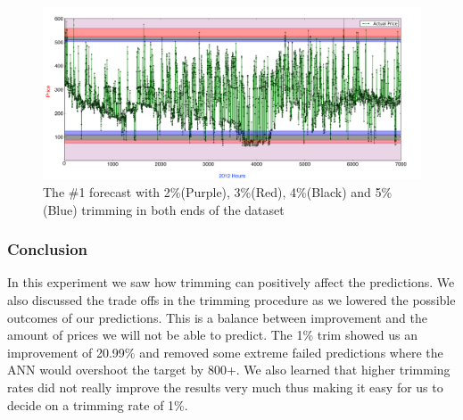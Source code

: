\begin{figure}[H]
\centering
\includegraphics[width=\linewidth]{billeder/PriceExperimentalAnalysis/restOfTrims.png}
\caption{The \#1 forecast with 2\%(Purple), 3\%(Red), 4\%(Black) and 5\%(Blue) trimming in both ends of the dataset}
\label{fig:AllTrims}
\end{figure}



\begin{table}[H]
\centering  %
\caption{Trims} %
\label{table:Top10Trimming} %
\end{table}


\subsubsection{Conclusion}
In this experiment we saw how trimming can positively affect the predictions. We also discussed the trade offs in the trimming procedure as we lowered the possible outcomes of our predictions. This is a balance between improvement and the amount of prices we will not be able to predict. The 1\% trim showed us an improvement of 20.99\% and removed some extreme failed predictions where the ANN would overshoot the target by 800+. We also learned that higher trimming rates did not really improve the results very much thus making it easy for us to decide on a trimming rate of 1\%.

